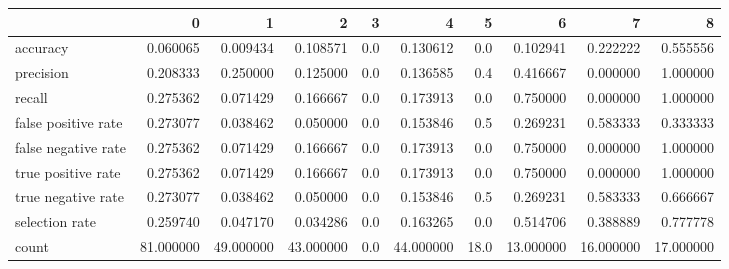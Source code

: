 \begin{tabular}{lrrrrrrrrr}
\toprule
{} &          0 &          1 &          2 &    3 &          4 &     5 &          6 &          7 &          8 \\
\midrule
accuracy            &   0.060065 &   0.009434 &   0.108571 &  0.0 &   0.130612 &   0.0 &   0.102941 &   0.222222 &   0.555556 \\
precision           &   0.208333 &   0.250000 &   0.125000 &  0.0 &   0.136585 &   0.4 &   0.416667 &   0.000000 &   1.000000 \\
recall              &   0.275362 &   0.071429 &   0.166667 &  0.0 &   0.173913 &   0.0 &   0.750000 &   0.000000 &   1.000000 \\
false positive rate &   0.273077 &   0.038462 &   0.050000 &  0.0 &   0.153846 &   0.5 &   0.269231 &   0.583333 &   0.333333 \\
false negative rate &   0.275362 &   0.071429 &   0.166667 &  0.0 &   0.173913 &   0.0 &   0.750000 &   0.000000 &   1.000000 \\
true positive rate  &   0.275362 &   0.071429 &   0.166667 &  0.0 &   0.173913 &   0.0 &   0.750000 &   0.000000 &   1.000000 \\
true negative rate  &   0.273077 &   0.038462 &   0.050000 &  0.0 &   0.153846 &   0.5 &   0.269231 &   0.583333 &   0.666667 \\
selection rate      &   0.259740 &   0.047170 &   0.034286 &  0.0 &   0.163265 &   0.0 &   0.514706 &   0.388889 &   0.777778 \\
count               &  81.000000 &  49.000000 &  43.000000 &  0.0 &  44.000000 &  18.0 &  13.000000 &  16.000000 &  17.000000 \\
\bottomrule
\end{tabular}

